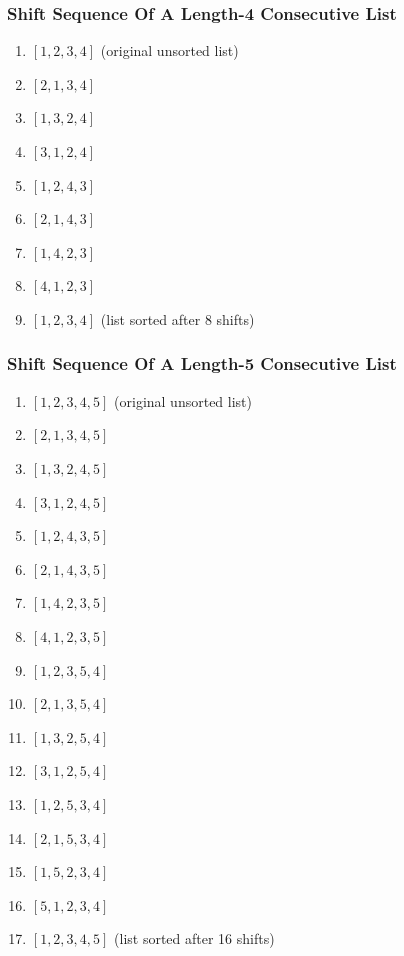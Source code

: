 \documentclass[12pt]{article}
\begin{document}
\subsubsection{Shift Sequence Of A Length-4 Consecutive List}
\begin{enumerate}[start=0]
    \item $[1, 2, 3, 4]$ (original unsorted list)
    \item $[2, 1, 3, 4]$
    \item $[1, 3, 2, 4]$
    \item $[3, 1, 2, 4]$
    \item $[1, 2, 4, 3]$
    \item $[2, 1, 4, 3]$
    \item $[1, 4, 2, 3]$
    \item $[4, 1, 2, 3]$
    \item $[1, 2, 3, 4]$ (list sorted after 8 shifts)
\end{enumerate}

\subsubsection{Shift Sequence Of A Length-5 Consecutive List}
\begin{enumerate}[start=0]
    \item $[1, 2, 3, 4, 5]$ (original unsorted list)
    \item $[2, 1, 3, 4, 5]$
    \item $[1, 3, 2, 4, 5]$
    \item $[3, 1, 2, 4, 5]$
    \item $[1, 2, 4, 3, 5]$
    \item $[2, 1, 4, 3, 5]$
    \item $[1, 4, 2, 3, 5]$
    \item $[4, 1, 2, 3, 5]$
    \item $[1, 2, 3, 5, 4]$
    \item $[2, 1, 3, 5, 4]$
    \item $[1, 3, 2, 5, 4]$
    \item $[3, 1, 2, 5, 4]$
    \item $[1, 2, 5, 3, 4]$
    \item $[2, 1, 5, 3, 4]$
    \item $[1, 5, 2, 3, 4]$
    \item $[5, 1, 2, 3, 4]$
    \item $[1, 2, 3, 4, 5]$ (list sorted after 16 shifts)
\end{enumerate}
\end{document}
